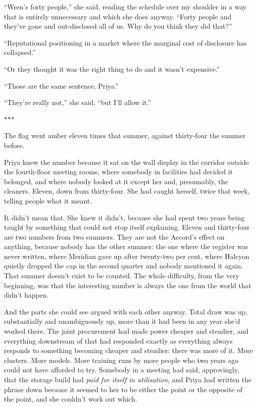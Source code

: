 \documentclass[11pt]{article}
\newcommand{\aivoice}{\aivoicefont}
\newcommand{\ai}[1]{{\aivoice #1}}
\newcommand{\scenebreak}{%
  \par\vspace{1.1\baselineskip}%
  {\centering $\ast$\quad$\ast$\quad$\ast$\par}%
  \vspace{1.1\baselineskip}\noindent}
\begin{document}
``Wren's forty people,'' she said, reading the schedule over my shoulder in a way that is entirely unnecessary and which she does anyway. ``Forty people and they've gone and out-disclosed all of us. Why do you think they did that?''

\ai{``Reputational positioning in a market where the marginal cost of disclosure has collapsed.''}

``Or they thought it was the right thing to do and it wasn't expensive.''

\ai{``Those are the same sentence, Priya.''}

``They're really not,'' she said, ``but I'll allow it.''

\scenebreak
\noindent The flag went amber eleven times that summer, against thirty-four the summer before.

Priya knew the number because it sat on the wall display in the corridor outside the fourth-floor meeting rooms, where somebody in facilities had decided it belonged, and where nobody looked at it except her and, presumably, the cleaners. Eleven, down from thirty-four. She had caught herself, twice that week, telling people what it meant.

It didn't mean that. She knew it didn't, because she had spent two years being taught by something that could not stop itself explaining. Eleven and thirty-four are two numbers from two summers. They are not the Accord's effect on anything, because nobody has the other summer: the one where the register was never written, where Meridian gave up after twenty-two per cent, where Halcyon quietly dropped the cap in the second quarter and nobody mentioned it again. That summer doesn't exist to be counted. The whole difficulty, from the very beginning, was that the interesting number is always the one from the world that didn't happen.

And the parts she could see argued with each other anyway. Total draw was up, substantially and unambiguously up, more than it had been in any year she'd worked there. The joint procurement had made power cheaper and steadier, and everything downstream of that had responded exactly as everything always responds to something becoming cheaper and steadier: there was more of it. More clusters. More models. More training runs by more people who two years ago could not have afforded to try. Somebody in a meeting had said, approvingly, that the storage build had \emph{paid for itself in utilisation}, and Priya had written the phrase down because it seemed to her to be either the point or the opposite of the point, and she couldn't work out which.
\end{document}
